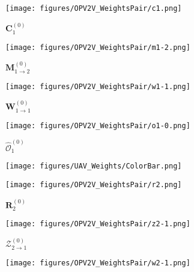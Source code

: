 \documentclass{article}
\begin{document}
\begin{figure}[!t]

  \centering
    \begin{subfigure}{0.22\linewidth}
    \texttt{[image: figures/OPV2V\_WeightsPair/c1.png]}
    \vspace{-5mm}
    \caption{$\mathbf{C}_1^{(0)}$}
    \label{fig:UAV_ConfMap1}
  \end{subfigure}
\begin{subfigure}{0.22\linewidth}
    \texttt{[image: figures/OPV2V\_WeightsPair/m1-2.png]}
    \vspace{-5mm}
    \caption{$\mathbf{M}_{1\rightarrow 2}^{(0)}$}
    \label{fig:UAV_SelectMat1}
  \end{subfigure}
  \begin{subfigure}{0.22\linewidth}
    \texttt{[image: figures/OPV2V\_WeightsPair/w1-1.png]}
    \vspace{-5mm}
    \caption{$\mathbf{W}_{1\rightarrow 1}^{(0)}$}
    \label{fig:UAV_AttenWeight1to1}
  \end{subfigure}
  \begin{subfigure}{0.22\linewidth}
    \texttt{[image: figures/OPV2V\_WeightsPair/o1-0.png]}
    \vspace{-5mm}
    \caption{$\widehat{\mathcal{O}}_{1}^{(0)}$}
    \label{fig:UAV_Detections}
  \end{subfigure}
  \begin{subfigure}{0.07\linewidth}
    \texttt{[image: figures/UAV\_Weights/ColorBar.png]}
  \end{subfigure}
  \centering
  \begin{subfigure}{0.22\linewidth}
    \texttt{[image: figures/OPV2V\_WeightsPair/r2.png]}
    \vspace{-5mm}
    \caption{$\mathbf{R}_2^{(0)}$}
    \label{fig:UAV_RequestMap2}
  \end{subfigure}
\begin{subfigure}{0.22\linewidth}
    \texttt{[image: figures/OPV2V\_WeightsPair/z2-1.png]}
    \vspace{-5mm}
    \caption{$\mathcal{Z}_{2\rightarrow 1}^{(0)}$}
    \label{fig:UAV_Message2}
  \end{subfigure}
  \begin{subfigure}{0.22\linewidth}
    \texttt{[image: figures/OPV2V\_WeightsPair/w2-1.png]}
    \vspace{-5mm}

\end{subfigure}
\end{figure}
\end{document}
